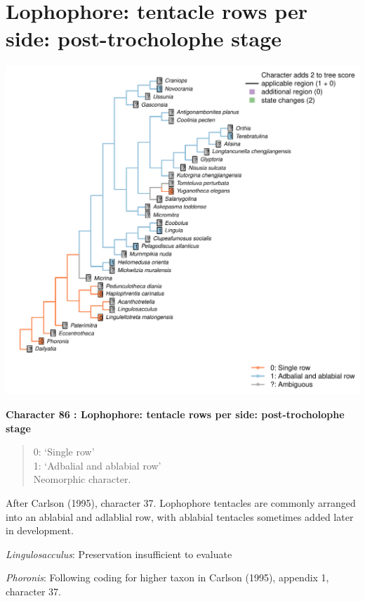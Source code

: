 \documentclass[]{book}
\theoremstyle{definition}
\theoremstyle{definition}
\theoremstyle{definition}
\theoremstyle{remark}
\begin{document}
\hypertarget{lophophore-tentacle-rows-per-side-post-trocholophe-stage}{%
\section*{Lophophore: tentacle rows per side: post-trocholophe
stage}\label{lophophore-tentacle-rows-per-side-post-trocholophe-stage}}

\includegraphics{Brachiopod_phylogeny_files/figure-latex/unnamed-chunk-5-86.pdf}

\textbf{Character 86 : Lophophore: tentacle rows per side:
post-trocholophe stage }

\begin{quote}
0: `Single row'\\
1: `Adbalial and ablabial row'\\
Neomorphic character.
\end{quote}

After Carlson (1995), character 37. Lophophore tentacles are commonly
arranged into an ablabial and adlablial row, with ablabial tentacles
sometimes added later in development.

\emph{Lingulosacculus}: Preservation insufficient to evaluate

\emph{Phoronis}: Following coding for higher taxon in Carlson (1995),
appendix 1, character 37.
\end{document}
